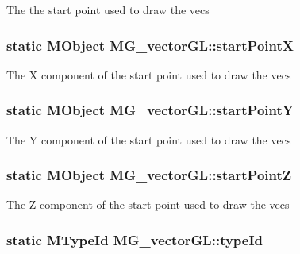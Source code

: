 The the start point used to draw the vecs \hypertarget{class_m_g__vector_g_l_ae7c3a0612e7db7b56e6e96c0179aefc6}{
\subsubsection[{start\-Point\-X}]{\setlength{\rightskip}{0pt plus 5cm}static M\-Object M\-G\-\_\-vector\-G\-L\-::start\-Point\-X\hspace{0.3cm}{\ttfamily [static]}}}\label{class_m_g__vector_g_l_ae7c3a0612e7db7b56e6e96c0179aefc6}
The X component of the start point used to draw the vecs \hypertarget{class_m_g__vector_g_l_af1d06d50730959946fc5db507eefa3aa}{
\subsubsection[{start\-Point\-Y}]{\setlength{\rightskip}{0pt plus 5cm}static M\-Object M\-G\-\_\-vector\-G\-L\-::start\-Point\-Y\hspace{0.3cm}{\ttfamily [static]}}}\label{class_m_g__vector_g_l_af1d06d50730959946fc5db507eefa3aa}
The Y component of the start point used to draw the vecs \hypertarget{class_m_g__vector_g_l_a00e63c6a4cf63e7c71cc22e094578470}{
\subsubsection[{start\-Point\-Z}]{\setlength{\rightskip}{0pt plus 5cm}static M\-Object M\-G\-\_\-vector\-G\-L\-::start\-Point\-Z\hspace{0.3cm}{\ttfamily [static]}}}\label{class_m_g__vector_g_l_a00e63c6a4cf63e7c71cc22e094578470}
The Z component of the start point used to draw the vecs \hypertarget{class_m_g__vector_g_l_acca8150a834863494fd5f1b00680289e}{
\subsubsection[{type\-Id}]{\setlength{\rightskip}{0pt plus 5cm}static M\-Type\-Id M\-G\-\_\-vector\-G\-L\-::type\-Id\hspace{0.3cm}{\ttfamily [static]}}}\label{class_m_g__vector_g_l_acca8150a834863494fd5f1b00680289e}
